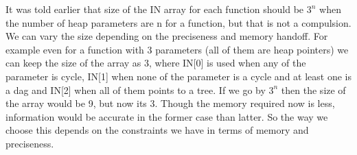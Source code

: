 It was told earlier that size of the IN array for each function should be $3^n$ when the number of heap parameters are n for a function, but 
that is not a compulsion.
We can vary the size depending on the preciseness and memory handoff. For example even for a function with 3 parameters (all of them are heap pointers) we 
can keep the size of the array as 3, where IN[0] is used 
when any of the parameter is cycle, IN[1] when none of the parameter is a cycle and at least one is a dag and IN[2] when all of them points to a tree. If 
we go by $3^n$ then the size of the array
would be 9, but now its 3. Though the memory required now is less, information would be accurate in the former case than latter. So the way we choose 
this depends on the constraints we have in terms of memory and preciseness.

